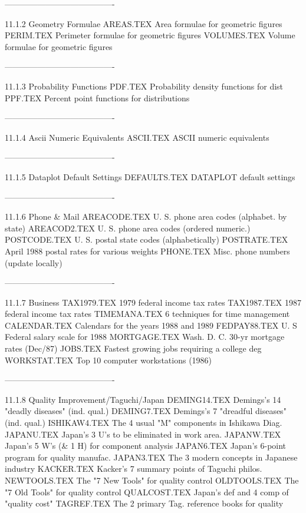 ----------------------------------------
 
11.1.2
Geometry Formulae
      AREAS.TEX     Area formulae for geometric figures
      PERIM.TEX     Perimeter formulae for geometric figures
      VOLUMES.TEX   Volume formulae for geometric figures
 
 
 
----------------------------------------
 
11.1.3
Probability Functions
      PDF.TEX       Probability density functions for dist
      PPF.TEX       Percent point functions for distributions
 
 
 
----------------------------------------
 
11.1.4
Ascii Numeric Equivalents
      ASCII.TEX     ASCII numeric equivalents
 
 
 
----------------------------------------
 
11.1.5
Dataplot Default Settings
      DEFAULTS.TEX  DATAPLOT default settings
 
 
 
----------------------------------------
 
11.1.6
Phone & Mail
      AREACODE.TEX  U. S. phone area codes (alphabet. by state)
      AREACOD2.TEX  U. S. phone area codes (ordered numeric.)
      POSTCODE.TEX  U. S. postal state codes (alphabetically)
      POSTRATE.TEX  April 1988 postal rates for various weights
      PHONE.TEX     Misc. phone numbers (update locally)
 
 
 
----------------------------------------
 
11.1.7
Business
      TAX1979.TEX   1979 federal income tax rates
      TAX1987.TEX   1987 federal income tax rates
      TIMEMANA.TEX  6 techniques for time management
      CALENDAR.TEX  Calendars for the years 1988 and 1989
      FEDPAY88.TEX  U. S Federal salary scale for 1988
      MORTGAGE.TEX  Wash. D. C. 30-yr mortgage rates (Dec/87)
      JOBS.TEX      Fastest growing jobs requiring a college deg
      WORKSTAT.TEX  Top 10 computer workstations (1986)
 
 
 
----------------------------------------
 
11.1.8
Quality Improvement/Taguchi/Japan
      DEMING14.TEX  Demings's 14 "deadly diseases" (ind. qual.)
      DEMING7.TEX   Demings's 7 "dreadful diseases" (ind. qual.)
      ISHIKAW4.TEX  The 4 usual "M" components in Ishikawa Diag.
      JAPANU.TEX    Japan's 3  U's to be eliminated in work area.
      JAPANW.TEX    Japan's 5 W's (& 1 H) for component analysis
      JAPAN6.TEX    Japan's 6-point program for quality manufac.
      JAPAN3.TEX    The 3 modern concepts in Japanese industry
      KACKER.TEX    Kacker's 7 summary points of Taguchi philos.
      NEWTOOLS.TEX  The "7 New Tools" for quality control
      OLDTOOLS.TEX  The "7 Old Tools" for quality control
      QUALCOST.TEX  Japan's def and 4 comp of "quality cost"
      TAGREF.TEX    The 2 primary Tag. reference books for quality
 
